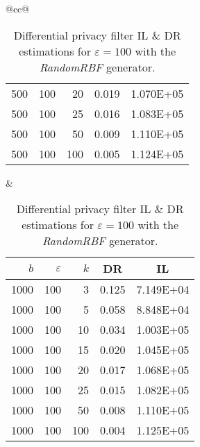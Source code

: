 \begin{table}[H]
\begin{tabular}{@{}cc@{}}
\begin{tabular}{@{}rrrrr@{}}
			500 & 100 & 20  & 0.019 & 1.070E+05 \\
			500 & 100 & 25  & 0.016 & 1.083E+05 \\
			500 & 100 & 50  & 0.009 & 1.110E+05 \\
			500 & 100 & 100 & 0.005 & 1.124E+05 \\ \bottomrule
		\end{tabular}
		&
		\begin{tabular}{@{}rrrrr@{}}
			\toprule
			$b$ & $\varepsilon$ & $k$ & \multicolumn{1}{c}{DR} & \multicolumn{1}{c}{IL} \\ \midrule
			1000 & 100 & 3   & 0.125 & 7.149E+04 \\
			1000 & 100 & 5   & 0.058 & 8.848E+04 \\
			1000 & 100 & 10  & 0.034 & 1.003E+05 \\
			1000 & 100 & 15  & 0.020 & 1.045E+05 \\
			1000 & 100 & 20  & 0.017 & 1.068E+05 \\
			1000 & 100 & 25  & 0.015 & 1.082E+05 \\
			1000 & 100 & 50  & 0.008 & 1.110E+05 \\
			1000 & 100 & 100 & 0.004 & 1.125E+05 \\ \bottomrule
		\end{tabular}
	\end{tabular}
	\caption[Differential privacy filter DR \& IL estimations (RandomRBF), $\varepsilon = 100$.]{Differential privacy filter IL \& DR estimations for $\varepsilon = 100$ with the \textit{RandomRBF} generator.}
	\label{table:results-rbf-diff-priv-e100}
\end{table}

